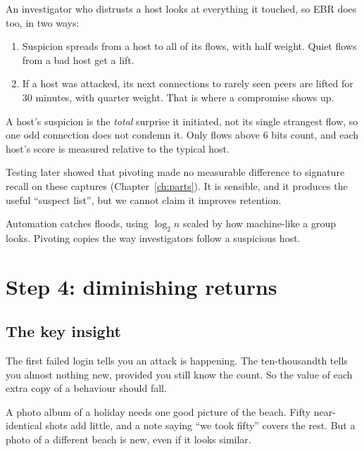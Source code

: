 An investigator who distrusts a host looks at everything it touched, so EBR does too, in two ways:
\begin{enumerate}
\item Suspicion spreads from a host to all of its flows, with half weight. Quiet flows from a bad host get a lift.
\item If a host was attacked, its next connections to rarely seen peers are lifted for 30 minutes, with quarter weight. That is where a compromise shows up.
\end{enumerate}

A host's suspicion is the \emph{total} surprise it initiated, not its single strangest flow, so one odd connection does not condemn it. Only flows above 6 bits count, and each host's score is measured relative to the typical host.

\begin{honest}
Testing later showed that pivoting made no measurable difference to signature recall on these captures (Chapter~\ref{ch:parts}). It is sensible, and it produces the useful ``suspect list'', but we cannot claim it improves retention.
\end{honest}

\begin{recap}
Automation catches floods, using $\log_2 n$ scaled by how machine-like a group looks. Pivoting copies the way investigators follow a suspicious host.
\end{recap}

\chapter{Step 4: diminishing returns}
\label{ch:diminishing}

\section{The key insight}
The first failed login tells you an attack is happening. The ten-thousandth tells you almost nothing new, provided you still know the count. So the value of each extra copy of a behaviour should fall.

\begin{analogy}
A photo album of a holiday needs one good picture of the beach. Fifty near-identical shots add little, and a note saying ``we took fifty'' covers the rest. But a photo of a different beach is new, even if it looks similar.
\end{analogy}

